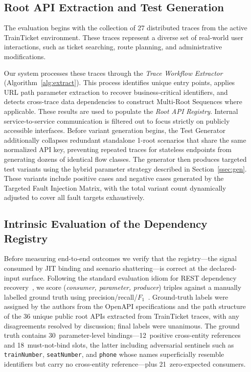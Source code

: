 \documentclass[conference]{IEEEtran}
\begin{document}
\subsection{Root API Extraction and Test Generation} 
The evaluation begins with the collection of 27 distributed traces from the active TrainTicket environment. These traces represent a diverse set of real-world user interactions, such as ticket searching, route planning, and administrative modifications.

Our system processes these traces through the \textit{Trace Workflow Extractor} (Algorithm~\ref{alg:extract}). This process identifies unique entry points, applies URL path parameter extraction to recover business-critical identifiers, and detects cross-trace data dependencies to construct Multi-Root Sequences where applicable. These results are used to populate the \textit{Root API Registry}. Internal service-to-service communication is filtered out to focus strictly on publicly accessible interfaces. Before variant generation begins, the Test Generator additionally collapses redundant standalone 1-root scenarios that share the same normalized API key, preventing repeated traces for stateless endpoints from generating dozens of identical flow classes. The generator then produces targeted test variants using the hybrid parameter strategy described in Section~\ref{ssec:gen}. These variants include positive cases and negative cases generated by the Targeted Fault Injection Matrix, with the total variant count dynamically adjusted to cover all fault targets exhaustively.

\subsection{Intrinsic Evaluation of the Dependency Registry}\label{ssec:semantic-eval}
Before measuring end-to-end outcomes we verify that the registry---the signal consumed by JIT binding and scenario shattering---is correct at the declared-input surface. Following the standard evaluation idiom for REST dependency recovery~\cite{atlidakis2019restler,viglianisi2020resttestgen,liu2022morest,golmohammadi2023survey}, we score (\textit{consumer, parameter, producer}) triples against a manually labelled ground truth using precision/recall/$F_1$~\cite{manning2008ir}. Ground-truth labels were assigned by the authors from the OpenAPI specifications and the path structure of the 36 unique public root APIs extracted from TrainTicket traces, with any disagreements resolved by discussion; final labels were unanimous. The ground truth contains 30~parameter-level bindings---12~positive cross-entity references and 18~must-not-bind slots, the latter including adversarial sentinels such as \texttt{trainNumber}, \texttt{seatNumber}, and \texttt{phone} whose names superficially resemble identifiers but carry no cross-entity reference---plus 21~zero-expected consumers.
\end{document}
